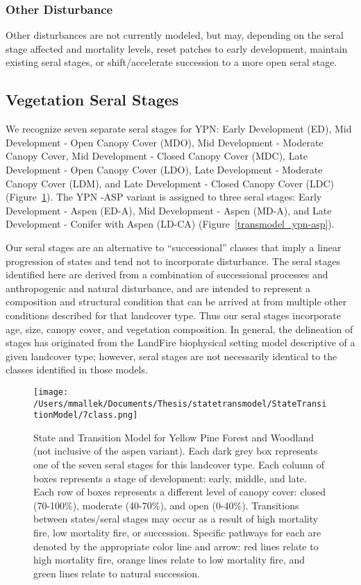 \subsubsection{Other Disturbance}
Other disturbances are not currently modeled, but may, depending on the seral stage affected and mortality levels, reset patches to early development, maintain existing seral stages, or shift/accelerate succession to a more open seral stage. 

\subsection*{Vegetation Seral Stages}
We recognize seven separate seral stages for YPN: Early Development (ED), Mid Development - Open Canopy Cover (MDO), Mid Development - Moderate Canopy Cover, Mid Development - Closed Canopy Cover (MDC), Late Development - Open Canopy Cover (LDO), Late Development - Moderate Canopy Cover (LDM), and Late Development - Closed Canopy Cover (LDC) (Figure~\ref{transmodel_ypn}).  The YPN -ASP variant is assigned to three seral stages: Early Development - Aspen (ED-A), Mid Development - Aspen (MD-A), and Late Development - Conifer with Aspen (LD-CA) (Figure~\ref{transmodel_ypn-asp}).

Our seral stages are an alternative to ``successional'' classes that imply a linear progression of states and tend not to incorporate disturbance. The seral stages identified here are derived from a combination of successional processes and anthropogenic and natural disturbance, and are intended to represent a composition and structural condition that can be arrived at from multiple other conditions described for that landcover type. Thus our seral stages incorporate age, size, canopy cover, and vegetation composition. In general, the delineation of stages has originated from the LandFire biophysical setting model descriptive of a given landcover type; however, seral stages are not necessarily identical to the classes identified in those models.

\begin{figure}[htbp]
\centering
\texttt{[image: /Users/mmallek/Documents/Thesis/statetransmodel/StateTransitionModel/7class.png]}
\caption{State and Transition Model for Yellow Pine Forest and Woodland (not inclusive of the aspen variant). Each dark grey box represents one of the seven seral stages for this landcover type. Each column of boxes represents a stage of development: early, middle, and late. Each row of boxes represents a different level of canopy cover: closed (70-100\%), moderate (40-70\%), and open (0-40\%). Transitions between states/seral stages may occur as a result of high mortality fire, low mortality fire, or succession. Specific pathways for each are denoted by the appropriate color line and arrow: red lines relate to high mortality fire, orange lines relate to low mortality fire, and green lines relate to natural succession.} 
\label{transmodel_ypn}
\end{figure}

